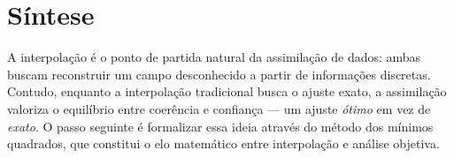 \section{Síntese}
A interpolação é o ponto de partida natural da assimilação de dados: ambas buscam reconstruir um campo desconhecido a partir de informações discretas. Contudo, enquanto a interpolação tradicional busca o ajuste exato, a assimilação valoriza o equilíbrio entre coerência e confiança --- um ajuste \emph{ótimo} em vez de \emph{exato}. O passo seguinte é formalizar essa ideia através do método dos mínimos quadrados, que constitui o elo matemático entre interpolação e análise objetiva.

